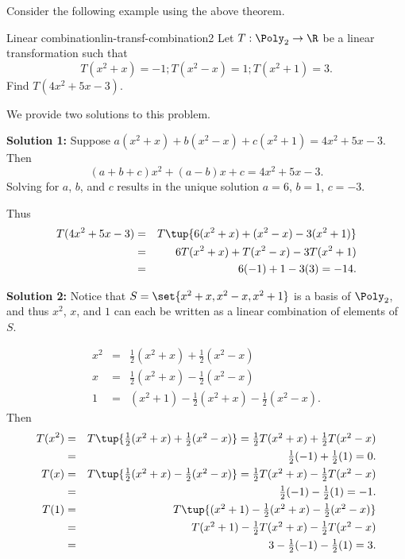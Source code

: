 Consider the following example using the above theorem. 

\begin{example}{Linear combination}{lin-transf-combination2}
Let $T:\Poly_2 \to \R$ be a linear transformation such that
\[ T(x^2+x)=-1; T(x^2-x)=1; T(x^2+1)=3.\]
Find $T(4x^2+5x-3)$.
\end{example}

\begin{solution}
We provide two solutions to this problem.

\textbf{Solution 1:}
Suppose
$a(x^2+x) + b(x^2-x) + c(x^2+1) = 4x^2+5x-3$. 
Then
\[ (a+b+c)x^2 + (a-b)x + c = 4x^2+5x-3.\]
Solving for $a$, $b$, and $c$ results in the unique solution
$a=6$, $b=1$, $c=-3$.

Thus
\begin{eqnarray*}
T(4x^2+5x-3) & = & T\tup{6(x^2+x) + (x^2-x) -3(x^2+1) } \\
& = & 6T(x^2+x) + T(x^2-x) -3T(x^2+1) \\
& = & 6(-1) + 1 -3(3) = -14. \\
\end{eqnarray*}

\textbf{Solution 2:}
Notice that
$S=\set{x^2+x, x^2-x, x^2+1}$ is a basis of $\Poly_2$, and
thus $x^2$, $x$, and $1$ can each be written as a linear 
combination of elements of $S$.

\begin{eqnarray*}
x^2 & = & \textstyle \frac{1}{2}(x^2+x) + \frac{1}{2}(x^2-x) \\
x & = & \textstyle \frac{1}{2}(x^2+x) - \frac{1}{2}(x^2-x) \\
1 & = & (x^2+1)-\textstyle \frac{1}{2}(x^2+x) - \frac{1}{2}(x^2-x).
\end{eqnarray*}
Then
\begin{eqnarray*}
T(x^2) & = & \textstyle T\tup{\frac{1}{2}(x^2+x) + \frac{1}{2}(x^2-x)}
=\frac{1}{2}T(x^2+x) + \frac{1}{2}T(x^2-x)\\
& = & \textstyle \frac{1}{2}(-1) + \frac{1}{2}(1) = 0.  \\
T(x) & = & \textstyle T\tup{\frac{1}{2}(x^2+x) - \frac{1}{2}(x^2-x)}
= \frac{1}{2}T(x^2+x) - \frac{1}{2}T(x^2-x) \\
& = & \textstyle \frac{1}{2}(-1) - \frac{1}{2}(1) = -1.\\
T(1) & = & \textstyle T\tup{(x^2+1)-\frac{1}{2}(x^2+x) -
\frac{1}{2}(x^2-x)}\\
& = & \textstyle T(x^2+1)-\frac{1}{2}T(x^2+x) - \frac{1}{2}T(x^2-x) \\
& = & \textstyle 3-\frac{1}{2}(-1) - \frac{1}{2}(1) = 3.
\end{eqnarray*}


\end{solution}
